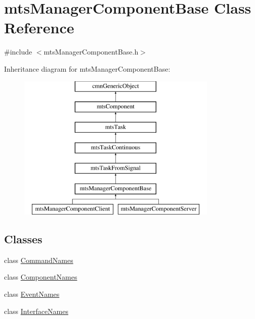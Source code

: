 \hypertarget{classmts_manager_component_base}{\section{mts\-Manager\-Component\-Base Class Reference}
\label{classmts_manager_component_base}
}


{\ttfamily \#include $<$mts\-Manager\-Component\-Base.\-h$>$}

Inheritance diagram for mts\-Manager\-Component\-Base\-:\begin{figure}[H]
\begin{center}
\leavevmode
\includegraphics[height=7.000000cm]{da/d32/classmts_manager_component_base}
\end{center}
\end{figure}
\subsection*{Classes}
\begin{DoxyCompactItemize}
\item 
class \hyperlink{classmts_manager_component_base_1_1_command_names}{Command\-Names}
\item 
class \hyperlink{classmts_manager_component_base_1_1_component_names}{Component\-Names}
\item 
class \hyperlink{classmts_manager_component_base_1_1_event_names}{Event\-Names}
\item 
class \hyperlink{classmts_manager_component_base_1_1_interface_names}{Interface\-Names}
\end{DoxyCompactItemize}
